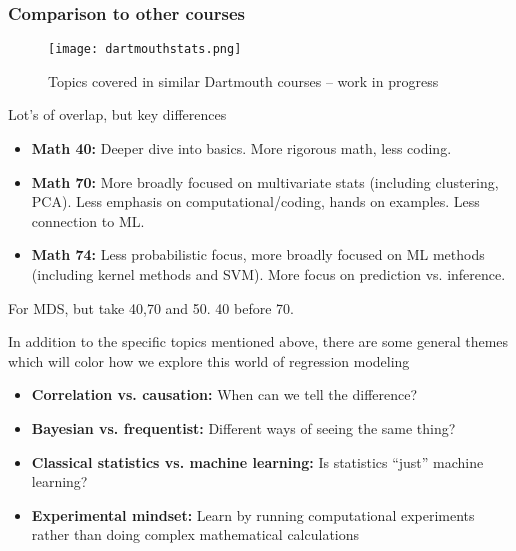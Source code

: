 \documentclass[serif,mathserif]{beamer}
\begin{document}
\begin{frame}
\frametitle{Comparison to other courses}


\begin{figure}
        \centering
        \texttt{[image: dartmouthstats.png]}
        \caption{Topics covered in similar Dartmouth courses --  work in progress}
\end{figure}
    
 \pause

    


\end{frame}

\begin{frame}


Lot's of overlap, but key differences 
\begin{itemize}
\item {\bf Math 40:} Deeper dive into basics. More rigorous math, less coding. 
\item {\bf Math 70:} More broadly focused on multivariate stats (including clustering, PCA). Less emphasis on computational/coding, hands on examples. Less connection to ML. 
\item {\bf Math 74:} Less probabilistic focus, more broadly focused on ML methods (including kernel methods and SVM). More focus on prediction vs. inference. 
\end{itemize}

\pause
For MDS, but take 40,70 and 50. 40 before 70. 



\end{frame}


\begin{frame}

In addition to the specific topics mentioned above, there are some general themes which will color how we explore this world of regression modeling
\begin{itemize}
\item {\bf Correlation vs. causation:} When can we tell the difference? 
\item {\bf Bayesian vs. frequentist:} Different ways of seeing the same thing?  
\item {\bf Classical statistics vs. machine learning:} Is statistics ``just'' machine learning? 
\item {\bf Experimental mindset:}  Learn by running computational experiments rather than doing complex mathematical calculations 
\end{itemize}


\end{frame}
\end{document}
